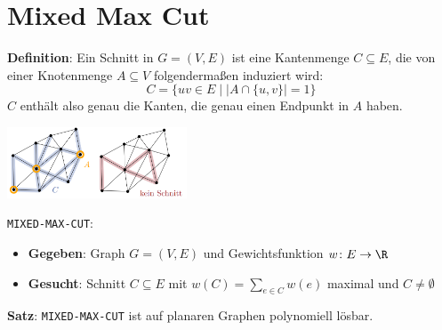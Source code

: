 \section{Mixed Max Cut}

\textbf{Definition}: Ein Schnitt in $G=(V,E)$ ist eine Kantenmenge $C\subseteq E$, die von einer Knotenmenge $A\subseteq V$ folgendermaßen induziert wird:
$$C=\{uv\in E\mid |A\cap\{u,v\}|=1\}$$
$C$ enthält also genau die Kanten, die genau einen Endpunkt in $A$ haben.\\

\begin{center}
	\includegraphics[width=0.4\textwidth]{images/cut.png}
\end{center}
\pagebreak

\texttt{MIXED-MAX-CUT}: 
\begin{itemize}
	\item \textbf{Gegeben}: Graph $G=(V,E)$ und Gewichtsfunktion $w\colon E\rightarrow\R$
	\item \textbf{Gesucht}: Schnitt $C\subseteq E$ mit $w(C)=\sum\limits_{e\in C} w(e)$ maximal und $C\neq\emptyset$
\end{itemize}
\bigskip
\textbf{Satz}: \texttt{MIXED-MAX-CUT} ist auf planaren Graphen polynomiell lösbar.

